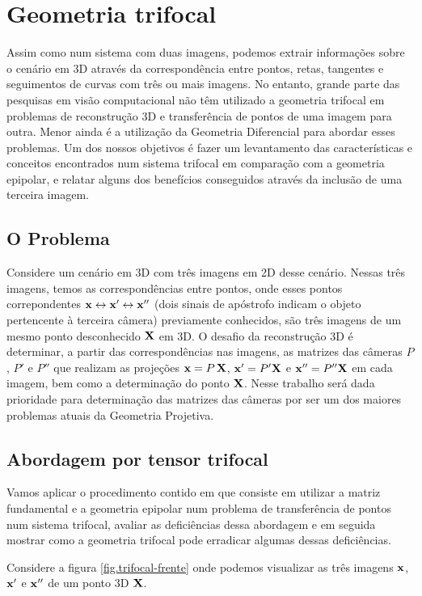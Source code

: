 \section{Geometria trifocal}
Assim como num sistema com duas imagens, podemos extrair informações sobre o cenário em 3D através da correspondência entre pontos, retas, tangentes e seguimentos de curvas com três  ou mais imagens. No entanto, grande parte das pesquisas em visão computacional não têm utilizado a geometria trifocal em problemas de reconstrução 3D e transferência de pontos de uma imagem para outra. Menor ainda é a utilização da Geometria Diferencial para abordar esses problemas. Um dos nossos objetivos é fazer um levantamento das características e conceitos encontrados num sistema trifocal em comparação com a geometria epipolar, e relatar alguns dos benefícios conseguidos através da inclusão de uma terceira imagem.

\subsection{O Problema}
Considere um cenário em 3D com três imagens em 2D desse cenário. Nessas três imagens, temos as correspondências entre pontos, onde esses pontos correpondentes $\mathbf{x}\leftrightarrow\mathbf{x}'\leftrightarrow\mathbf{x}''$ (dois sinais de apóstrofo indicam o objeto pertencente à terceira câmera) previamente conhecidos, são três imagens de um mesmo ponto desconhecido $\mathbf{X}$ em 3D. O desafio da reconstrução 3D é determinar, a partir das correspondências nas imagens, as matrizes das câmeras $P$, $P'$ e $P''$ que realizam as projeções $\mathbf{x}=P\,\mathbf{X}$, $\mathbf{x}'=P'\mathbf{X}$ e $\mathbf{x}''=P''\mathbf{X}$ em cada imagem, bem como a determinação do ponto $\mathbf{X}$. Nesse trabalho será dada prioridade para determinação das matrizes das câmeras por ser um dos maiores problemas atuais da Geometria Projetiva. 

\subsection{Abordagem por tensor trifocal}
Vamos aplicar o procedimento contido em \citep{Faugeras} que consiste em utilizar a matriz fundamental e a geometria epipolar num problema de transferência de pontos num sistema trifocal, avaliar as deficiências dessa abordagem e em seguida mostrar como a geometria trifocal pode erradicar algumas dessas deficiências. 

Considere a figura \ref{fig.trifocal-frente} onde podemos visualizar as três imagens $\mathbf{x}$, $\mathbf{x}'$ e $\mathbf{x}''$ de um ponto 3D $\mathbf{X}$. 

